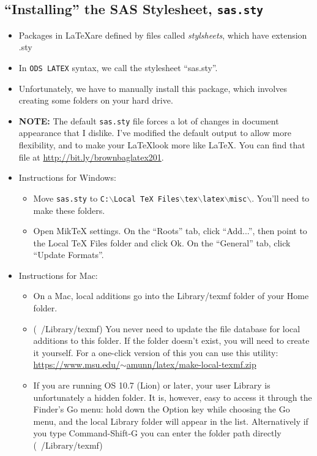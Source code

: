 \documentclass{article}
\begin{document}
	\subsection{``Installing'' the SAS Stylesheet, \texttt{sas.sty}}
	\begin{itemize}
		\item Packages in \LaTeX are defined by files called \textit{stylsheets}, which have extension .sty
		\item In \texttt{ODS LATEX} syntax, we call the stylesheet ``sas.sty''. 
		\item Unfortunately, we have to manually install this package, which involves creating some folders on your hard drive.
		\item \textbf{NOTE:} The default \texttt{sas.sty} file forces a lot of changes in document appearance that I dislike. I've modified the default output to allow more flexibility, and to make your \LaTeX look more like \LaTeX. You can find that file at \href{http://bit.ly/brownbaglatex201}{http://bit.ly/brownbaglatex201}.
		\item Instructions for Windows:
		\begin{itemize}
			\item  Move \texttt{sas.sty} to \texttt{C:$\backslash$Local TeX Files$\backslash$tex$\backslash$latex$\backslash$misc$\backslash$}. You'll need to make these folders.
			\item Open MikTeX settings. On the ``Roots'' tab, click ``Add...'', then point to the Local TeX Files folder and click Ok. On the ``General'' tab, click ``Update Formats''.
		\end{itemize}
		\item Instructions for Mac:
		\begin{itemize}
			\item On a Mac, local additions go into the Library/texmf folder of your Home folder.
			\item (~/Library/texmf) You never need to update the file database for local additions to this folder. If the folder doesn't exist, you will need to create it yourself. For a one-click version of this you can use this utility: \href{https://www.msu.edu/~amunn/latex/make-local-texmf.zip}{https://www.msu.edu/$\sim$amunn/latex/make-local-texmf.zip}
			\item If you are running OS 10.7 (Lion) or later, your user Library is unfortunately a hidden folder. It is, however, easy to access it through the Finder's Go menu: hold down the Option key while choosing the Go menu, and the local Library folder will appear in the list. Alternatively if you type Command-Shift-G you can enter the folder path directly (~/Library/texmf)

\end{itemize}
\end{itemize}
\end{document}
